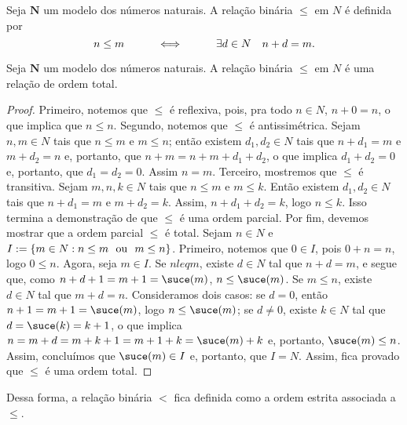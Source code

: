 \begin{defi}
	Seja $\bm N$ um modelo dos números naturais. A relação binária $\leq$ em $N$ é definida por
	\begin{equation*}
	n \leq m \qquad \quad \Longleftrightarrow \quad \qquad \exists d \in N \quad n+d=m.
	\end{equation*}
\end{defi}

\begin{prop}
	Seja $\bm N$ um modelo dos números naturais. A relação binária $\leq$ em $N$ é uma relação de ordem total.
\end{prop}
\begin{proof}
	Primeiro, notemos que $\leq$ é reflexiva, pois, pra todo $n \in N$, $n+0=n$, o que implica que $n \leq n$. Segundo, notemos que $\leq$ é antissimétrica. Sejam $n,m \in N$ tais que $n \leq m$ e $m \leq n$; então existem $d_1,d_2 \in N$ tais que $n+d_1=m$ e $m+d_2=n$ e, portanto, que $n+m=n+m+d_1+d_2$, o que implica $d_1+d_2=0$ e, portanto, que $d_1=d_2=0$. Assim $n=m$. Terceiro, mostremos que $\leq$ é transitiva. Sejam $m,n,k \in N$ tais que $n \leq m$ e $m \leq k$. Então existem $d_1,d_2 \in N$ tais que $n+d_1=m$ e $m+d_2=k$. Assim, $n+d_1+d_2=k$, logo $n \leq k$. Isso termina a demonstração de que $\leq$ é uma ordem parcial. Por fim, devemos mostrar que a ordem parcial $\leq$ é total. Sejam $n \in N$ e $I := \{m \in N: n \leq m \text{\ \ ou\ \ } m \leq n\}$. Primeiro, notemos que $0 \in I$, pois $0+n=n$, logo $0 \leq n$. Agora, seja $m \in I$. Se $n leq m$, existe $d \in N$ tal que $n+d=m$, e segue que, como $n+d+1=m+1=\suce(m)$, $n \leq \suce(m)$. Se $m \leq n$, existe $d \in N$ tal que $m+d=n$. Consideramos dois casos: se $d=0$, então $n+1=m+1=\suce(m)$, logo $n \leq \suce(m)$; se $d \neq 0$, existe $k \in N$ tal que $d=\suce(k)=k+1$, o que implica $n=m+d=m+k+1=m+1+k=\suce(m)+k$ e, portanto, $\suce(m) \leq n$. Assim, concluímos que $\suce(m) \in I$ e, portanto, que $I=N$. Assim, fica provado que $\leq$ é uma ordem total.
\end{proof}

	Dessa forma, a relação binária $<$ fica definida como a ordem estrita associada a $\leq$.

